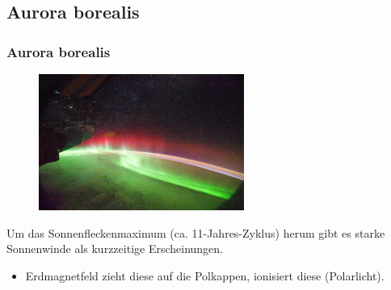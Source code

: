 \subsection{Aurora borealis}

\begin{frame}
  \frametitle{Aurora borealis}

  \begin{center}
    \begin{figure}
      \includegraphics[width=0.6\textwidth,height=.5\textheight,keepaspectratio]{bv11/Aurora_Seen_From_Space_by_NASA.jpg}
    \end{figure}
  \end{center}

  Um das Sonnenfleckenmaximum (ca. 11-Jahres-Zyklus) herum gibt es starke
  Sonnenwinde als kurzzeitige Erscheinungen.

  \begin{itemize}
    \item Erdmagnetfeld zieht diese auf die Polkappen, ionisiert diese (Polarlicht).
  \end{itemize}

\end{frame}

